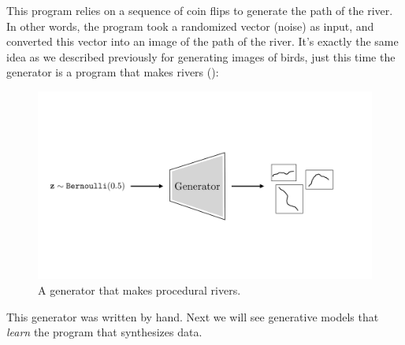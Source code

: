 This program relies on a sequence of coin flips to generate the path of the river. In other words, the program took a randomized vector (noise) as input, and converted this vector into an image of the path of the river. It's exactly the same idea as we described previously for generating images of birds, just this time the generator is a program that makes rivers (\fig{\ref{fig:generative_models:gen_model_of_rivers_diagram}}):%
\begin{figure}[h]
    \centerline{
    \includegraphics[width=0.75\linewidth]{./figures/generative_models/gen_model_of_rivers_diagram.pdf}
    }
    \caption{A generator that makes procedural rivers.}
    \label{fig:generative_models:gen_model_of_rivers_diagram}
\end{figure}

This generator was written by hand. Next we will see generative models that \textit{learn} the program that synthesizes data.%

